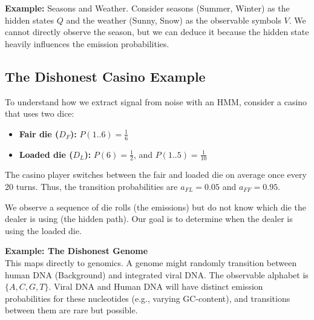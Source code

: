 \textbf{Example:} Seasons and Weather.
Consider seasons (Summer, Winter) as the hidden states \( Q \) and the weather (Sunny, Snow) as the observable symbols \( V \). We cannot directly observe the season, but we can deduce it because the hidden state heavily influences the emission probabilities.

\subsection{The Dishonest Casino Example}

To understand how we extract signal from noise with an HMM, consider a casino that uses two dice:
\begin{itemize}
    \item \textbf{Fair die (\(D_F\)):} \( P(1..6) = \frac{1}{6} \)
    \item \textbf{Loaded die (\(D_L\)):} \( P(6) = \frac{1}{2} \), and \( P(1..5) = \frac{1}{10} \)
\end{itemize}
The casino player switches between the fair and loaded die on average once every 20 turns. Thus, the transition probabilities are \( a_{FL} = 0.05 \) and \( a_{FF} = 0.95 \).

\begin{center}
\end{center}

We observe a sequence of die rolls (the emissions) but do not know which die the dealer is using (the hidden path). Our goal is to determine when the dealer is using the loaded die. 

\textbf{Example: The Dishonest Genome}\\
This maps directly to genomics. A genome might randomly transition between human DNA (Background) and integrated viral DNA. The observable alphabet is $\{A, C, G, T\}$. Viral DNA and Human DNA will have distinct emission probabilities for these nucleotides (e.g., varying GC-content), and transitions between them are rare but possible.

